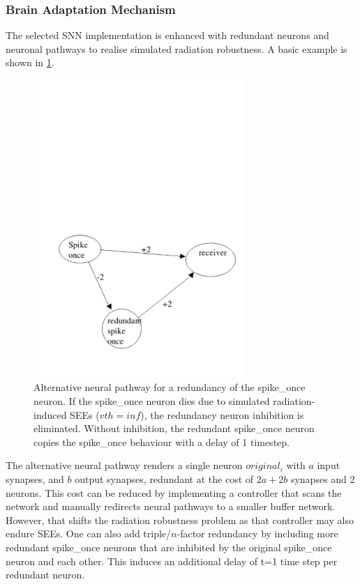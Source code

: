 \subsubsection{Brain Adaptation Mechanism}\label{subsubsec:brain_adaptation_mechanisms}
The selected SNN implementation is enhanced with redundant neurons and neuronal pathways to realise simulated radiation robustness. A basic example is shown in \cref{fig:eg_brain_adaptation}.
\begin{figure}[H]
    \centering
    \includegraphics[width=8cm]{latex/Images/brain_adaptation.pdf}
    \caption{Alternative neural pathway for a redundancy of the spike\_once neuron. If the spike\_once neuron dies due to simulated radiation-induced SEEs ($vth=inf$), the redundancy neuron inhibition is eliminated. Without inhibition, the redundant spike\_once neuron copies the spike\_once behaviour with a delay of 1 timestep.}
    \label{fig:eg_brain_adaptation}
\end{figure}

\noindent The alternative neural pathway renders a single neuron $original_i$ with $a$ input synapses, and $b$ output synapses, redundant at the cost of $2a+2b$ synapses and 2 neurons. This cost can be reduced by implementing a controller that scans the network and manually redirects neural pathways to a smaller buffer network. However, that shifts the radiation robustness problem as that controller may also endure SEEs. %
One can also add triple/$n$-factor redundancy by including more redundant spike\_once neurons that are inhibited by the original spike\_once neuron and each other. This induces an additional delay of t=1 time step per redundant neuron.

